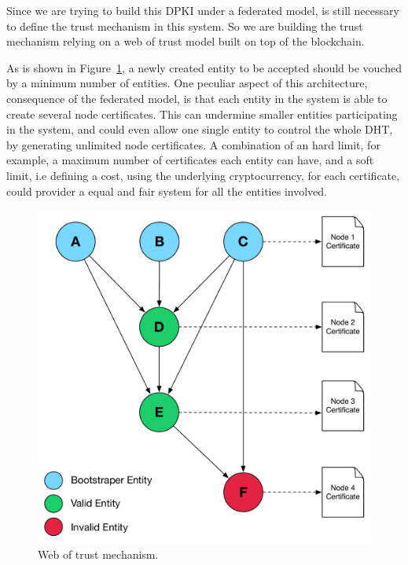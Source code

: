 Since we are trying to build this \ac{DPKI} under a federated model, is still necessary to define the trust mechanism in this system.
So we are building the trust mechanism relying on a web of trust model built on top of the blockchain.

As is shown in Figure~\ref{fig:web-of-trust-architecture}, a newly created entity to be accepted should be vouched by a minimum number of entities.
One peculiar aspect of this architecture, consequence of the federated model, is that each entity in the system is able to create several node certificates.
This can undermine smaller entities participating in the system, and could even allow one single entity to control the whole \ac{DHT}, by generating unlimited node certificates.
A combination of an hard limit, for example, a maximum number of certificates each entity can have, and a soft limit, i.e defining a cost, using the underlying cryptocurrency, for each certificate, could provider a equal and fair system for all the entities involved.

\begin{figure}
  \centering
  \includegraphics[scale=0.5]{Figures/web-trust-main.pdf}
  \caption{Web of trust mechanism.}
\label{fig:web-of-trust-architecture}
\end{figure}


